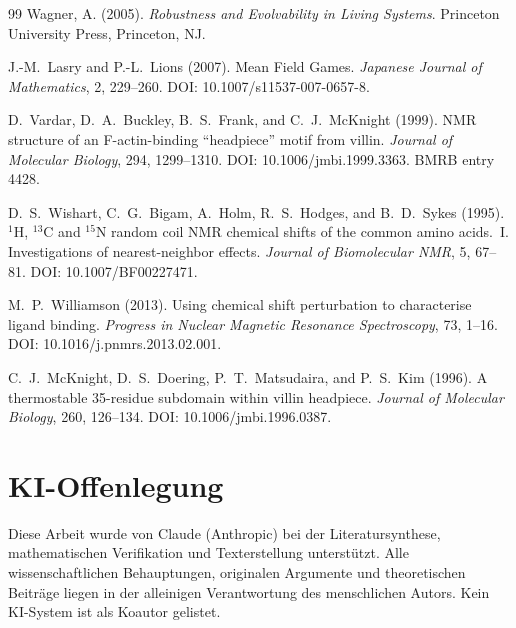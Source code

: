 \documentclass[12pt,a4paper]{article}
\theoremstyle{remark}
\begin{document}
\begin{thebibliography}{99}
Wagner, A. (2005).
\newblock \textit{Robustness and Evolvability in Living Systems}.
\newblock Princeton University Press, Princeton, NJ.

J.-M.~Lasry and P.-L.~Lions (2007).
\newblock Mean Field Games.
\newblock \textit{Japanese Journal of Mathematics}, 2, 229--260.
\newblock DOI: 10.1007/s11537-007-0657-8.

D.~Vardar, D.~A.~Buckley, B.~S.~Frank, and C.~J.~McKnight (1999).
\newblock NMR structure of an F-actin-binding ``headpiece'' motif from villin.
\newblock \textit{Journal of Molecular Biology}, 294, 1299--1310.
\newblock DOI: 10.1006/jmbi.1999.3363.
\newblock BMRB entry 4428.

D.~S.~Wishart, C.~G.~Bigam, A.~Holm, R.~S.~Hodges, and B.~D.~Sykes (1995).
\newblock $^1$H, $^{13}$C and $^{15}$N random coil NMR chemical shifts of the common amino acids.~I. Investigations of nearest-neighbor effects.
\newblock \textit{Journal of Biomolecular NMR}, 5, 67--81.
\newblock DOI: 10.1007/BF00227471.

M.~P.~Williamson (2013).
\newblock Using chemical shift perturbation to characterise ligand binding.
\newblock \textit{Progress in Nuclear Magnetic Resonance Spectroscopy}, 73, 1--16.
\newblock DOI: 10.1016/j.pnmrs.2013.02.001.

C.~J.~McKnight, D.~S.~Doering, P.~T.~Matsudaira, and P.~S.~Kim (1996).
\newblock A thermostable 35-residue subdomain within villin headpiece.
\newblock \textit{Journal of Molecular Biology}, 260, 126--134.
\newblock DOI: 10.1006/jmbi.1996.0387.

\end{thebibliography}

\section*{KI-Offenlegung}
Diese Arbeit wurde von Claude (Anthropic) bei der Literatursynthese, mathematischen Verifikation und Texterstellung unterst\"utzt. Alle wissenschaftlichen Behauptungen, originalen Argumente und theoretischen Beitr\"age liegen in der alleinigen Verantwortung des menschlichen Autors. Kein KI-System ist als Koautor gelistet.
\end{document}
